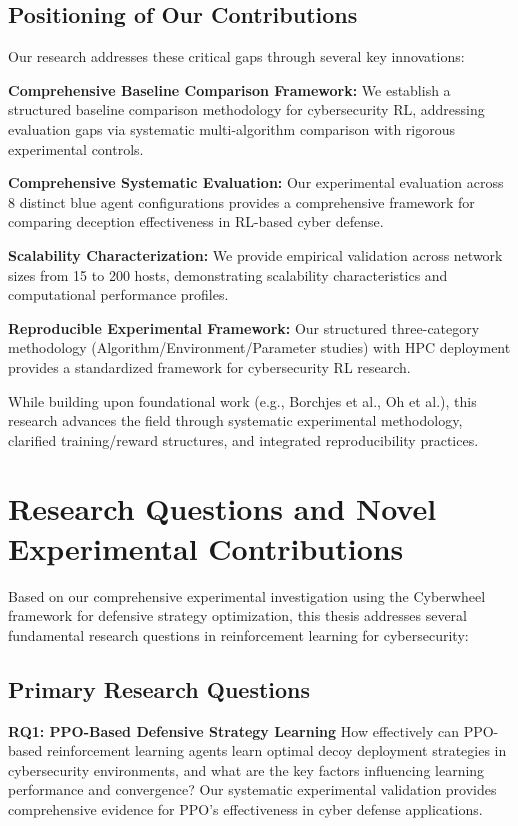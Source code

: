 \documentclass[12pt,twoside]{article}
\theoremstyle{definition}
\theoremstyle{plain}
\begin{document}
\subsection{Positioning of Our Contributions}

Our research addresses these critical gaps through several key innovations:

\textbf{Comprehensive Baseline Comparison Framework:} We establish a structured baseline comparison methodology for cybersecurity RL, addressing evaluation gaps via systematic multi-algorithm comparison with rigorous experimental controls.

\textbf{Comprehensive Systematic Evaluation:} Our experimental evaluation across 8 distinct blue agent configurations provides a comprehensive framework for comparing deception effectiveness in RL-based cyber defense.

\textbf{Scalability Characterization:} We provide empirical validation across network sizes from 15 to 200 hosts, demonstrating scalability characteristics and computational performance profiles.

\textbf{Reproducible Experimental Framework:} Our structured three-category methodology (Algorithm/Environment/Parameter studies) with HPC deployment provides a standardized framework for cybersecurity RL research.

While building upon foundational work (e.g., Borchjes et al., Oh et al.), this research advances the field through systematic experimental methodology, clarified training/reward structures, and integrated reproducibility practices.

\section{Research Questions and Novel Experimental Contributions}

Based on our comprehensive experimental investigation using the Cyberwheel framework for defensive strategy optimization, this thesis addresses several fundamental research questions in reinforcement learning for cybersecurity:

\subsection{Primary Research Questions}

\textbf{RQ1: PPO-Based Defensive Strategy Learning} 
How effectively can PPO-based reinforcement learning agents learn optimal decoy deployment strategies in cybersecurity environments, and what are the key factors influencing learning performance and convergence? Our systematic experimental validation provides comprehensive evidence for PPO's effectiveness in cyber defense applications.
\end{document}
